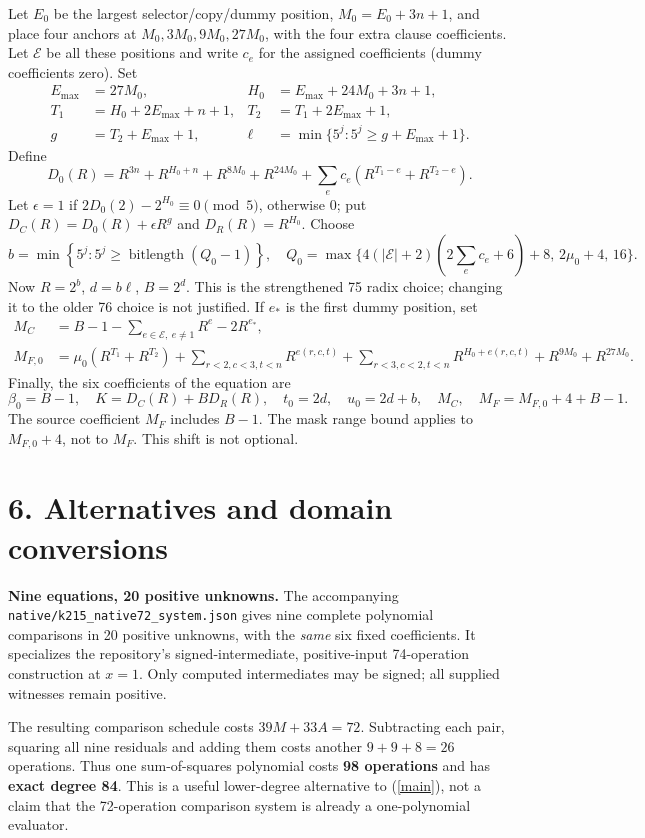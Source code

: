 \documentclass[10pt]{article}
\newcommand{\code}[1]{\texttt{#1}}
\begin{document}
Let $E_0$ be the largest selector/copy/dummy position, $M_0=E_0+3n+1$, and place four anchors at $M_0,3M_0,9M_0,27M_0$, with the four extra clause coefficients. Let $\mathcal E$ be all these positions and write $c_e$ for the assigned coefficients (dummy coefficients zero). Set
\begin{align*}
E_{\max}&=27M_0,&H_0&=E_{\max}+24M_0+3n+1,\\
T_1&=H_0+2E_{\max}+n+1,&T_2&=T_1+2E_{\max}+1,\\
g&=T_2+E_{\max}+1,&\ell&=\min\{5^j:5^j\ge g+E_{\max}+1\}.
\end{align*}
Define
\[
D_0(R)=R^{3n}+R^{H_0+n}+R^{8M_0}+R^{24M_0}
 +\sum_e c_e(R^{T_1-e}+R^{T_2-e}).
\]
Let $\epsilon=1$ if $2D_0(2)-2^{H_0}\equiv0\pmod5$, otherwise $0$; put
$D_C(R)=D_0(R)+\epsilon R^g$ and $D_R(R)=R^{H_0}$. Choose
\[
b=\min\left\{5^j:5^j\ge\operatorname{bitlength}(Q_0-1)\right\},\quad
Q_0=\max\{4(|\mathcal E|+2)(2\sum_e c_e+6)+8,\,2\mu_0+4,\,16\}.
\]
Now $R=2^b$, $d=b\ell$, $B=2^d$. This is the strengthened 75 radix choice; changing it to the older 76 choice is not justified. If $e_*$ is the first dummy position, set
\begin{align*}
M_C&=B-1-\sum_{e\in\mathcal E,\ e\ne1}R^e-2R^{e_*},\\
M_{F,0}&=\mu_0(R^{T_1}+R^{T_2})
 +\sum_{r<2,c<3,t<n}R^{e(r,c,t)}
 +\sum_{r<3,c<2,t<n}R^{H_0+e(r,c,t)}+R^{9M_0}+R^{27M_0}.
\end{align*}
Finally, the six coefficients of the equation are
\[
\boxed{\beta_0=B-1,\quad K=D_C(R)+BD_R(R),\quad
t_0=2d,\quad u_0=2d+b,\quad M_C,\quad M_F=M_{F,0}+4+B-1.}
\]
The source coefficient $M_F$ includes $B-1$. The mask range bound applies to $M_{F,0}+4$, not to $M_F$. This shift is not optional.
\newpage
\section*{6. Alternatives and domain conversions}
\textbf{Nine equations, 20 positive unknowns.} The accompanying
\code{native/k215\_native72\_system.json} gives nine complete polynomial comparisons in 20 positive unknowns, with the \emph{same} six fixed coefficients. It specializes the repository's signed-intermediate, positive-input 74-operation construction at $x=1$. Only computed intermediates may be signed; all supplied witnesses remain positive.

The resulting comparison schedule costs $39M+33A=72$. Subtracting each pair, squaring all nine residuals and adding them costs another $9+9+8=26$ operations. Thus one sum-of-squares polynomial costs \textbf{98 operations} and has \textbf{exact degree 84}. This is a useful lower-degree alternative to (\ref{main}), not a claim that the 72-operation comparison system is already a one-polynomial evaluator.
\end{document}
